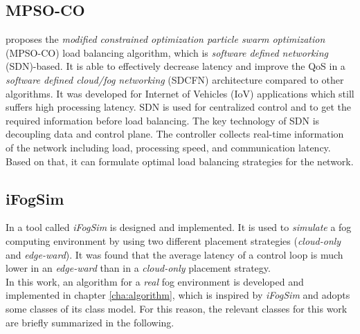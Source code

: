 \subsection*{MPSO-CO}

\cite{novel-load-balancing} proposes the \textit{modified constrained optimization particle swarm optimization} (MPSO-CO) load balancing algorithm, which is \textit{software defined networking} (SDN)-based.
It is able to effectively decrease latency and improve the QoS in a \textit{software defined cloud/fog networking} (SDCFN) architecture compared to other algorithms.
It was developed for Internet of Vehicles (IoV) applications which still suffers high processing latency.
SDN is used for centralized control and to get the required information before load balancing.
The key technology of SDN is decoupling data and control plane.
The controller collects real-time information of the network including load, processing speed, and communication latency.
Based on that, it can formulate optimal load balancing strategies for the network.

\subsection*{iFogSim}

In \cite{ifogsim} a tool called \textit{iFogSim} is designed and implemented.
It is used to \textit{simulate} a fog computing environment by using two different placement strategies (\textit{cloud-only} and \textit{edge-ward}).
It was found that the average latency of a control loop is much lower in an \textit{edge-ward} than in a \textit{cloud-only} placement strategy.\\

In this work, an algorithm for a \textit{real} fog environment is developed and implemented in chapter \ref{cha:algorithm}, which is inspired by \textit{iFogSim} and adopts some classes of its class model. For this reason, the relevant classes for this work are briefly summarized in the following.\\

